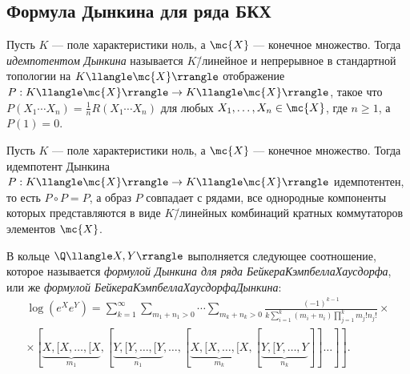 \documentclass[
	extrafontsizes,
	11pt,
	hyphens,
]{memoir}
\begin{document}
\subsection{Формула Дынкина для ряда БКХ}

\begin{definition}
Пусть \(K\) --- поле характеристики ноль,
а \(\mc{X}\) --- конечное множество.
Тогда \emph{идемпотентом Дынкина} называется \(K\)\=/линейное и непрерывное в стандартной топологии на \(K \llangle \mc{X} \rrangle\) отображение \(P : K \llangle \mc{X} \rrangle \to K \llangle \mc{X} \rrangle\), такое что
\(P(X_1 \cdots{} X_n) = \frac{1}{n} R(X_1 \cdots{} X_n)\) для любых \(X_1, \dots{}, X_n \in \mc{X}\), где \(n \geq 1\), а \(P(1) = 0\).
\end{definition}

\begin{observation}
Пусть \(K\) --- поле характеристики ноль,
а \(\mc{X}\) --- конечное множество.
Тогда идемпотент Дынкина \(P : K \llangle \mc{X} \rrangle \to K \llangle \mc{X} \rrangle\) идемпотентен, то есть \(P \circ P = P\),
а образ \(P\) совпадает с рядами, все однородные компоненты которых представляются в виде \(K\)\=/линейных комбинаций кратных коммутаторов элементов \(\mc{X}\).
\end{observation}

\begin{theorem}
В кольце \(\Q \llangle X, Y \rrangle\) выполняется следующее соотношение, которое называется \emph{формулой Дынкина для ряда Бейкера\namedash{}Кэмпбелла\namedash{}Хаусдорфа}, или же \emph{формулой Бейкера\namedash{}Кэмпбелла\namedash{}Хаусдорфа\namedash{}Дынкина}:
\begin{equation}
	\begin{gathered}
		\log(e^X e^Y) =
		\sum_{k=1}^{\infty}
		\sum_{m_1 + n_1 > 0}
		\cdots{}
		\sum_{m_k + n_k > 0}
		\frac%
		{
			(-1)^{k - 1}
		}
		{
			k
			\sum_{i = 1}^k (m_i + n_i)
			\prod_{j = 1}^k m_j! n_j!
		}
		\times
		\\
		\times
		[\underbrace{X, [X, \dots{}, [X}_{m_1},
		[\underbrace{Y, [Y, \dots{}, [Y}_{n_1},
		\dots{},
		[\underbrace{X, [X, \dots{}, [X}_{m_k},
		[\underbrace{Y, [Y, \dots{}, Y}_{n_k}]]
		\dots{}
		]].%
		\label{eq:BKHD_formula}
	\end{gathered}
\end{equation}
\end{theorem}
\end{document}
